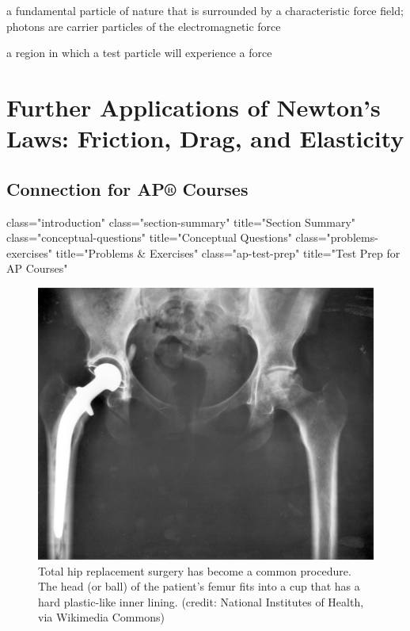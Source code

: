 \documentclass[
]{book}
\providecommand{\tightlist}{%
  \setlength{\itemsep}{0pt}\setlength{\parskip}{0pt}}
\begin{document}
\begin{description}
\tightlist
\item[carrier particle]
a fundamental particle of nature that is surrounded by a
characteristic force field; photons are carrier particles of the
electromagnetic force
\end{description}

\begin{description}
\tightlist
\item[force field]
a region in which a test particle will experience a force
\end{description}

\hypertarget{further-applications-of-newtons-laws-friction-drag-and-elasticity}{%
\chapter{Further Applications of Newton's Laws: Friction, Drag, and Elasticity}\label{further-applications-of-newtons-laws-friction-drag-and-elasticity}}

\hypertarget{connection-for-ap-courses-3}{%
\section{Connection for AP® Courses}\label{connection-for-ap-courses-3}}

class="introduction"
class="section-summary"
title="Section Summary"
class="conceptual-questions"
title="Conceptual Questions"
class="problems-exercises"
title="Problems \& Exercises"
class="ap-test-prep" title="Test
Prep for AP Courses"

\begin{figure}
\hypertarget{import-auto-id1165298796781}{%
\centering
\includegraphics{images/Figure_06_00_01.jpg}
\caption{Total hip replacement surgery has become a common procedure. The head
(or ball) of the patient's femur fits into a cup that has a hard
plastic-like inner lining. (credit: National Institutes of Health, via
Wikimedia
Commons)}\label{import-auto-id1165298796781}
}
\end{figure}
\end{document}
